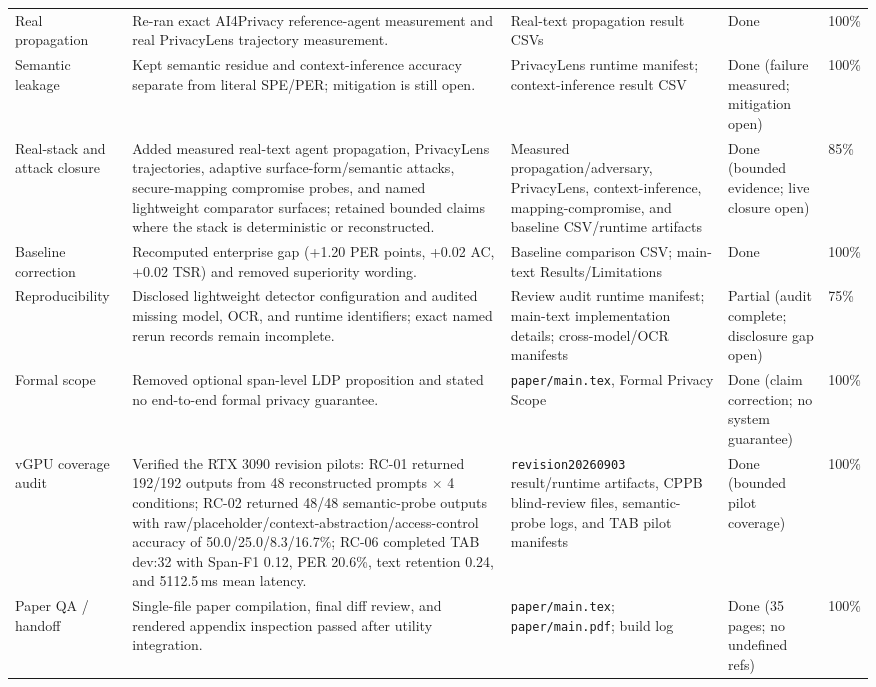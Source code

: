 \documentclass[11pt]{article}
\begin{document}
\begin{longtable}{p{}p{}p{}p{}p{}}
Real propagation & Re-ran exact AI4Privacy reference-agent measurement and real PrivacyLens trajectory measurement. & Real-text propagation result CSVs & Done & 100\% \\
Semantic leakage & Kept semantic residue and context-inference accuracy separate from literal SPE/PER; mitigation is still open. & PrivacyLens runtime manifest; context-inference result CSV & Done (failure measured; mitigation open) & 100\% \\
Real-stack and attack closure & Added measured real-text agent propagation, PrivacyLens trajectories, adaptive surface-form/semantic attacks, secure-mapping compromise probes, and named lightweight comparator surfaces; retained bounded claims where the stack is deterministic or reconstructed. & Measured propagation/adversary, PrivacyLens, context-inference, mapping-compromise, and baseline CSV/runtime artifacts & Done (bounded evidence; live closure open) & 85\% \\
Baseline correction & Recomputed enterprise gap (+1.20 PER points, +0.02 AC, +0.02 TSR) and removed superiority wording. & Baseline comparison CSV; main-text Results/Limitations & Done & 100\% \\
Reproducibility & Disclosed lightweight detector configuration and audited missing model, OCR, and runtime identifiers; exact named rerun records remain incomplete. & Review audit runtime manifest; main-text implementation details; cross-model/OCR manifests & Partial (audit complete; disclosure gap open) & 75\% \\
Formal scope & Removed optional span-level LDP proposition and stated no end-to-end formal privacy guarantee. & \texttt{paper/main.tex}, Formal Privacy Scope & Done (claim correction; no system guarantee) & 100\% \\
vGPU coverage audit & Verified the RTX 3090 revision pilots: RC-01 returned 192/192 outputs from 48 reconstructed prompts $\times$ 4 conditions; RC-02 returned 48/48 semantic-probe outputs with raw/placeholder/context-abstraction/access-control accuracy of 50.0/25.0/8.3/16.7\%; RC-06 completed TAB dev:32 with Span-F1 0.12, PER 20.6\%, text retention 0.24, and 5112.5\,ms mean latency. & \texttt{revision20260903} result/runtime artifacts, CPPB blind-review files, semantic-probe logs, and TAB pilot manifests & Done (bounded pilot coverage) & 100\% \\
Paper QA / handoff & Single-file paper compilation, final diff review, and rendered appendix inspection passed after utility integration. & \texttt{paper/main.tex}; \texttt{paper/main.pdf}; build log & Done (35 pages; no undefined refs) & 100\% \\

\end{longtable}
\end{document}
